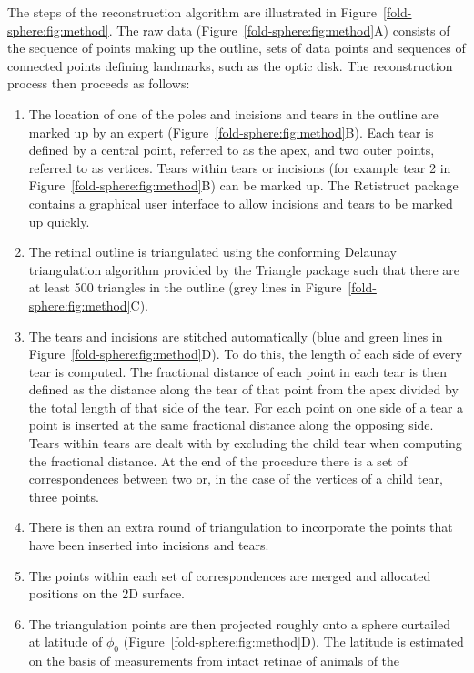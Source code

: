 \documentclass[10pt]{article}
\begin{document}
The steps of the reconstruction algorithm are illustrated in
Figure~\ref{fold-sphere:fig:method}. The raw data
(Figure~\ref{fold-sphere:fig:method}A) consists of the sequence of
points making up the outline, sets of data points and sequences of
connected points defining landmarks, such as the optic disk. The
reconstruction process then proceeds as follows:
\begin{enumerate}
\item The location of one of the poles and incisions and tears in the
  outline are marked up by an expert
  (Figure~\ref{fold-sphere:fig:method}B). Each tear is defined by a
  central point, referred to as the apex, and two outer points,
  referred to as vertices.  Tears within tears or incisions (for
  example tear 2 in Figure~\ref{fold-sphere:fig:method}B) can be
  marked up. The Retistruct package contains a graphical user
  interface to allow incisions and tears to be marked up quickly.
\item The retinal outline is triangulated using the conforming
  Delaunay triangulation algorithm provided by the Triangle package
  \cite{shewchuk96b} such that there are at least 500 triangles in
  the outline (grey lines in Figure~\ref{fold-sphere:fig:method}C).
\item The tears and incisions are stitched automatically (blue and
  green lines in Figure~\ref{fold-sphere:fig:method}D). To do this,
  the length of each side of every tear is computed. The fractional
  distance of each point in each tear is then defined as the distance
  along the tear of that point from the apex divided by the total
  length of that side of the tear. For each point on one side of a
  tear a point is inserted at the same fractional distance along the
  opposing side. Tears within tears are dealt with by excluding the
  child tear when computing the fractional distance. At the end of the
  procedure there is a set of correspondences between two or, in the
  case of the vertices of a child tear, three points.
\item There is then an extra round of triangulation to incorporate the
  points that have been inserted into incisions and tears.
\item The points within each set of correspondences are merged and
  allocated positions on the 2D surface.
\item The triangulation points are then projected roughly onto a
  sphere curtailed at latitude of $\phi_0$
  (Figure~\ref{fold-sphere:fig:method}D). The latitude is estimated
  on the basis of measurements from intact retinae of animals of the

\end{enumerate}
\end{document}
